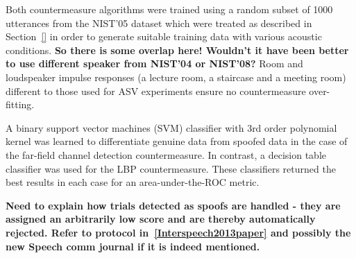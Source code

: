Both countermeasure algorithms were trained using a random subset of 1000 utterances from the NIST'05 dataset which were treated as described in Section~\ref{} in order to generate suitable training data with various acoustic conditions.  {\bfseries So there is some overlap here!  Wouldn't it have been better to use different speaker from NIST'04 or NIST'08?} Room and loudspeaker impulse responses (a lecture room, a staircase and a meeting room) different to those used for ASV experiments ensure no countermeasure over-fitting.

A binary support vector machines (SVM) classifier with 3rd order polynomial kernel was learned to differentiate genuine data from spoofed data in the case of the far-field channel detection countermeasure.  In contrast, a decision table classifier was used for the LBP countermeasure.  These classifiers returned the best results in each case for an area-under-the-ROC metric.  %

{\bfseries Need to explain how trials detected as spoofs are handled - they are assigned an arbitrarily low score and are thereby automatically rejected.  Refer to protocol in~\ref{Interspeech2013paper} and possibly the new Speech comm journal if it is indeed mentioned.}
